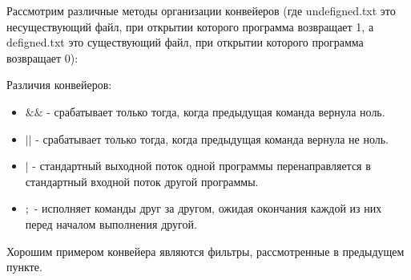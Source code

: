 \documentclass[14pt,a4paper,report]{report}
\begin{document}
Рассмотрим различные методы организации конвейеров (где undefigned.txt это несуществующий файл, при открытии которого программа возвращает 1, а defigned.txt это существующий файл, при открытии которого программа возвращает 0):



Различия конвейеров:

\begin{itemize}
	\item $\&\&$ - срабатывает только тогда, когда предыдущая команда вернула ноль.
	\item $||$ - срабатывает только тогда, когда предыдущая команда вернула не ноль.
	\item $|$ - стандартный выходной поток одной программы перенаправляется в стандартный входной поток другой программы.
	\item $;$ - исполняет команды друг за другом, ожидая окончания каждой из них перед началом выполнения другой.
\end{itemize}

Хорошим примером конвейера являются фильтры, рассмотренные в предыдущем пункте.
\end{document}
